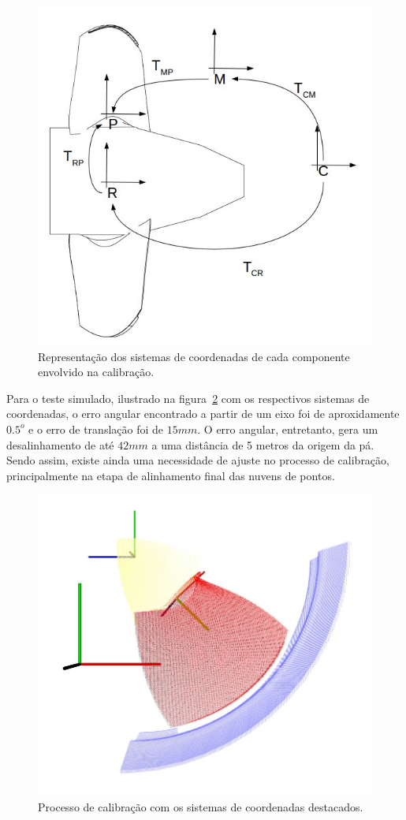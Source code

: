 \begin{figure}[h!]
	\centering
	\includegraphics[width=0.6\columnwidth]{method/figs/calibracao/tfs}
	\caption{Representação dos sistemas de coordenadas de cada componente
	envolvido na calibração.}
    \label{fig::tfs}
\end{figure}
	

Para o teste simulado, ilustrado na figura~\ref{fig::tf_error} com os
respectivos sistemas de coordenadas, o erro angular encontrado a partir de um
eixo foi de aproxidamente $0.5^o$ e o erro de translação foi de $15mm$. 
O erro angular, entretanto, gera um desalinhamento de até $42mm$ a uma distância
de 5 metros da origem da pá. Sendo assim, existe ainda uma necessidade de ajuste
no processo de calibração, principalmente na etapa de alinhamento final das
nuvens de pontos.

\begin{figure}[h!]
	\centering
	\includegraphics[width=0.7\columnwidth]{method/figs/calibracao/tf_error}
	\caption{Processo de calibração com os sistemas de coordenadas destacados.}
    \label{fig::tf_error}
\end{figure}

